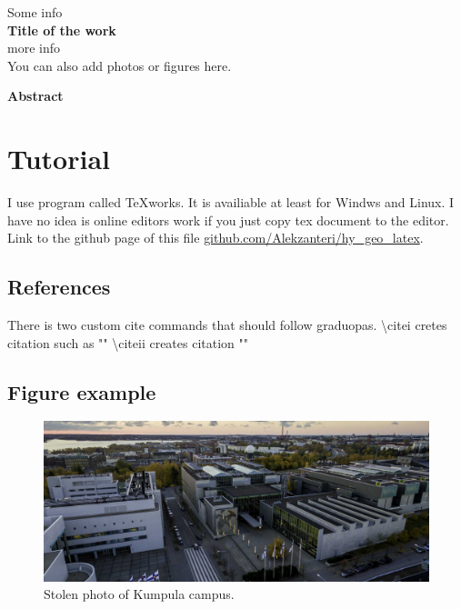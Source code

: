 \documentclass[12pt]{article}%
\begin{document}
\begin{titlepage}
\begin{center}
\vspace*{8cm}
Some info\\
\Large{\textbf{Title of the work}}\\
more info\\
\vspace*{4cm}
\tiny{You can also add photos or figures here.}
\end{center}
\end{titlepage}

{\Large \textbf{Abstract}}\\
\lipsum[1]
\newpage

\tableofcontents
\newpage

\fancyhead[C]{\thepage}
\setcounter{page}{3}

\section{Tutorial}
I use program called TeXworks. It is availiable at least for Windws and Linux. I have no idea is online editors work if you just copy tex document to the editor.\\

Link to the github page of this file \href{https://github.com/Alekzanteri/hy_geo_latex}{github.com/Alekzanteri/hy\_geo\_latex}.

\subsection{References}
There is two custom cite commands that should follow graduopas. \textbackslash citei cretes citation such as "" \textbackslash citeii creates citation "" 

\subsection{Figure example}
\begin{figure}[h]
\includegraphics[width=\linewidth]{kumpula_ilmakuva.jpg}
\caption{Stolen photo of Kumpula campus.}
\end{figure}
\end{document}
